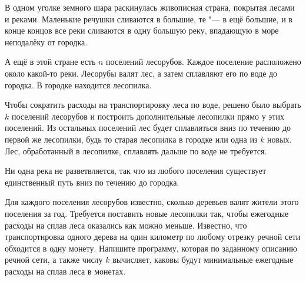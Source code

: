 
В одном уголке земного шара раскинулась живописная страна, покрытая лесами
и реками. Маленькие речушки сливаются в большие, те "--- в ещё
б\textit{о}льшие, и в конце концов все реки сливаются в одну большую
реку, впадающую в море неподалёку от городка.

А ещё в этой стране есть $n$ поселений лесорубов. Каждое поселение расположено
около какой-то реки. Лесорубы валят лес, а затем сплавляют его по воде
до городка. В городке находится лесопилка.

Чтобы сократить расходы на транспортировку леса по воде, решено было
выбрать $k$ поселений лесорубов и построить дополнительные лесопилки
прямо у этих поселений. Из остальных поселений лес будет сплавляться
вниз по течению до первой же лесопилки, будь то старая лесопилка
в городке или одна из $k$ новых. Лес, обработанный в лесопилке,
сплавлять дальше по воде не требуется.

Ни одна река не разветвляется, так что из любого поселения существует
единственный путь вниз по течению до городка.

Для каждого поселения лесорубов известно, сколько деревьев валят жители
этого поселения за год. Требуется поставить новые лесопилки так, чтобы
ежегодные расходы на сплав леса оказались как можно меньше.
Известно, что транспортировка одного дерева на один километр по любому
отрезку речной сети обходится в одну монету.
Напишите программу, которая по заданному описанию речной сети,
а также числу $k$ вычисляет, каковы будут минимальные ежегодные расходы
на сплав леса в монетах.

